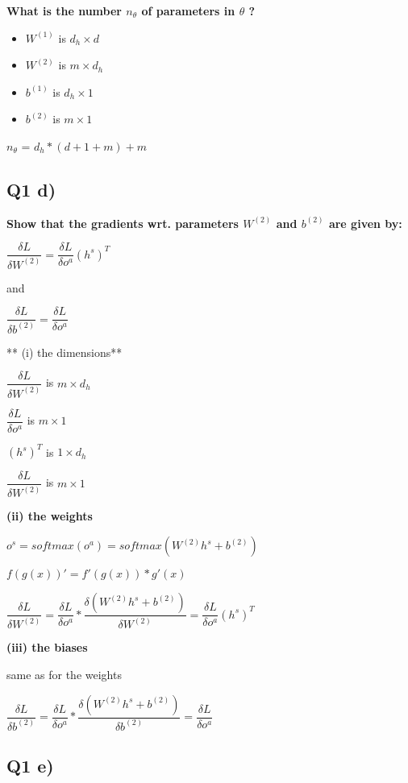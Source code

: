 \documentclass{article}
\begin{document}
    \textbf{What is the number $n_{\theta}$ of parameters in $\theta$ ?}

\begin{itemize}
\itemsep1pt\parskip0pt
\item
  $W^{(1)}$ is $d_h \times d$
\item
  $W^{(2)}$ is $m \times d_h$
\item
  $b^{(1)}$ is $d_h \times 1$
\item
  $b^{(2)}$ is $m \times 1$
\end{itemize}

$n_{\theta}$ = $d_h * (d+1 + m) + m$

    \subsection{Q1 d)}\label{q1-d}

    \textbf{Show that the gradients wrt. parameters $W^{(2)}$ and $b^{(2)}$
are given by:}

$\dfrac {\delta  L} {\delta W^{(2)}} = \dfrac {\delta L} {\delta o^a} (h^s)^T $

and

$\dfrac {\delta  L} {\delta b^{(2)}} = \dfrac {\delta L} {\delta o^a} $

    ** (i) the dimensions**

$\dfrac {\delta  L} {\delta W^{(2)}}$ is $m \times d_h$

$\dfrac {\delta L} {\delta o^a}$ is $m \times 1$

$(h^s)^T$ is $1 \times d_h$

$\dfrac {\delta  L} {\delta W^{(2)}}$ is $m \times 1$

\textbf{(ii) the weights}

$o^s = softmax(o^a) = softmax(W^{(2)}h^s + b^{(2)})$

$f(g(x))' = f'(g(x)) * g'(x)$

$\dfrac {\delta  L} {\delta W^{(2)}} = \dfrac {\delta L} {\delta o^a} * \dfrac {\delta (W^{(2)}h^s + b^{(2)})} {\delta W^{(2)}} = \dfrac {\delta L} {\delta o^a} (h^s)^T $

\textbf{(iii) the biases}

same as for the weights

$\dfrac {\delta  L} {\delta b^{(2)}} = \dfrac {\delta L} {\delta o^a} * \dfrac {\delta (W^{(2)}h^s + b^{(2)})} {\delta b^{(2)}} = \dfrac {\delta L} {\delta o^a} $

    \subsection{Q1 e)}\label{q1-e}
\end{document}
